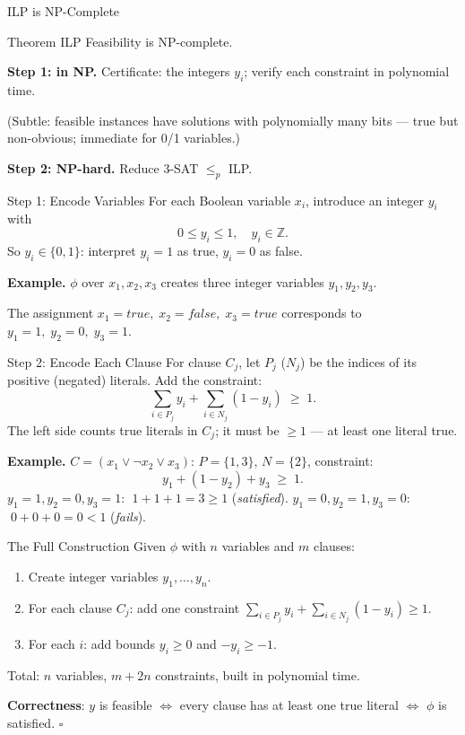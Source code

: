 \documentclass[10pt,aspectratio=169]{beamer}
\begin{document}
\begin{frame}{ILP is NP-Complete}
  \begin{block}{Theorem}
    ILP Feasibility is NP-complete.
  \end{block}

  \medskip
  \textbf{Step 1: in NP.} Certificate: the integers $y_i$; verify each
  constraint in polynomial time.

  \smallskip
  \small (Subtle: feasible instances have solutions with polynomially many
  bits — true but non-obvious; immediate for 0/1 variables.)

  \normalsize
  \medskip
  \textbf{Step 2: NP-hard.} Reduce 3-SAT $\le_p$ ILP.
\end{frame}

\begin{frame}{Step 1: Encode Variables}
  For each Boolean variable $x_i$, introduce an integer $y_i$ with
  \[
    0 \le y_i \le 1, \quad y_i \in \mathbb{Z}.
  \]
  So $y_i \in \{0, 1\}$: interpret $y_i = 1$ as \alert{true}, $y_i = 0$ as
  \alert{false}.

  \bigskip
  \textbf{Example.} \; $\phi$ over $x_1, x_2, x_3$ creates three integer
  variables $y_1, y_2, y_3$.

  The assignment $x_1 = \mathit{true},\; x_2 = \mathit{false},\;
  x_3 = \mathit{true}$ corresponds to $y_1 = 1,\; y_2 = 0,\; y_3 = 1$.
\end{frame}

\begin{frame}{Step 2: Encode Each Clause}
  For clause $C_j$, let $P_j$ ($N_j$) be the indices of its positive
  (negated) literals.  Add the constraint:
  \[
    \sum_{i \in P_j} y_i + \sum_{i \in N_j} (1 - y_i) \;\ge\; 1.
  \]
  The left side counts true literals in $C_j$;
  it must be $\ge 1$ — at least one literal true.

  \bigskip
  \textbf{Example.} \; $C = (x_1 \lor \neg x_2 \lor x_3)$:
  $P = \{1,3\}$, $N = \{2\}$, constraint:
  \[
    y_1 + (1 - y_2) + y_3 \;\ge\; 1.
  \]
  $y_1{=}1, y_2{=}0, y_3{=}1$: $\;1+1+1=3\ge1$ (\emph{satisfied}). \quad
  $y_1{=}0, y_2{=}1, y_3{=}0$: $\;0+0+0=0<1$ (\emph{fails}).
\end{frame}

\begin{frame}{The Full Construction}
  Given $\phi$ with $n$ variables and $m$ clauses:

  \begin{enumerate}
    \item Create integer variables $y_1, \ldots, y_n$.
    \item For each clause $C_j$: add one constraint
          $\displaystyle\sum_{i\in P_j} y_i + \sum_{i\in N_j}(1-y_i) \ge 1$.
    \item For each $i$: add bounds $y_i \ge 0$ and $-y_i \ge -1$.
  \end{enumerate}

  \medskip
  Total: $n$ variables, $m + 2n$ constraints, built in polynomial time.

  \bigskip
  \textbf{Correctness}: $y$ is feasible $\iff$ every clause has at least one
  true literal $\iff$ $\phi$ is satisfied. \hfill $\square$
\end{frame}
\end{document}
